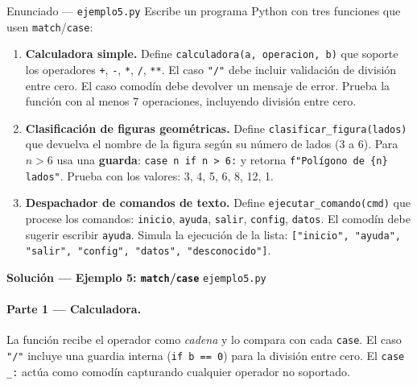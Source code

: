 \documentclass[12pt,a4paper]{article}
\begin{document}
\vspace{0.6em}
\begin{enunciadobox}{Enunciado — \texttt{ejemplo5.py}}
Escribe un programa Python con tres funciones que usen \texttt{match}/\texttt{case}:

\begin{enumerate}
  \item \textbf{Calculadora simple.}
        Define \texttt{calculadora(a, operacion, b)} que soporte los operadores
        \texttt{+}, \texttt{-}, \texttt{*}, \texttt{/}, \texttt{**}.
        El caso \texttt{"/"} debe incluir validación de división entre cero.
        El caso comodín debe devolver un mensaje de error.
        Prueba la función con al menos 7 operaciones, incluyendo división entre cero.

  \item \textbf{Clasificación de figuras geométricas.}
        Define \texttt{clasificar\_figura(lados)} que devuelva el nombre de la figura
        según su número de lados (3 a 6). Para $n > 6$ usa una \textbf{guarda}:
        \texttt{case n if n > 6:} y retorna \texttt{f"Polígono de \{n\} lados"}.
        Prueba con los valores: 3, 4, 5, 6, 8, 12, 1.

  \item \textbf{Despachador de comandos de texto.}
        Define \texttt{ejecutar\_comando(cmd)} que procese los comandos:
        \texttt{inicio}, \texttt{ayuda}, \texttt{salir}, \texttt{config}, \texttt{datos}.
        El comodín debe sugerir escribir \texttt{ayuda}.
        Simula la ejecución de la lista: \texttt{["inicio", "ayuda", "salir",
        "config", "datos", "desconocido"]}.
\end{enumerate}
\end{enunciadobox}

\newpage
\begin{solucionbanner}
  {\large\bfseries\color{solColor} Solución — Ejemplo 5: \texttt{match}/\texttt{case}}
  \hfill \texttt{ejemplo5.py}
\end{solucionbanner}

\vspace{0.8em}


\vspace{0.8em}
\paragraph{Parte 1 — Calculadora.}
La función recibe el operador como \emph{cadena} y lo compara con cada \texttt{case}.
El caso \texttt{"/"} incluye una guardia interna (\texttt{if b == 0}) para la división
entre cero.  El \texttt{case \_:} actúa como comodín capturando cualquier operador
no soportado.
\end{document}
